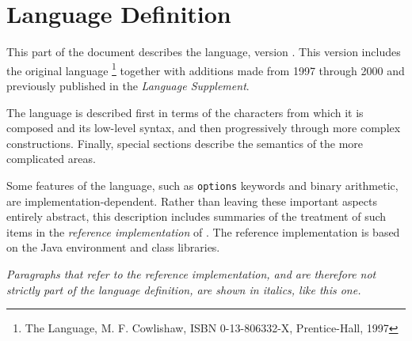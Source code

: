 \chapter{\nr{} Language Definition}\label{refpart3}
 
This part of the document describes the \nr{} language, version \nrversion{}.
This version includes the original \nr{} language
\footnote{
The \nr{} Language, M. F. Cowlishaw,
ISBN 0-13-806332-X, Prentice-Hall, 1997
}
together with additions made from 1997 through 2000 and previously
published in the \emph{\nr{} Language Supplement}.
 
The language is described first in terms of the characters from which it
is composed and its low-level syntax, and then progressively through
more complex constructions.
Finally, special sections describe the semantics of the more
complicated areas.
 
Some features of the language, such as \texttt{options} keywords and
binary arithmetic, are implementation-dependent.  Rather than leaving
these important aspects entirely abstract, this description includes
summaries of the treatment of such items in the \emph{reference
implementation} of \nr{}.  The reference implementation is based
on the Java environment and class libraries.
 
\emph{Paragraphs that refer to the reference implementation,
and are therefore not strictly part of the language definition, are
shown in italics, like this one.}

